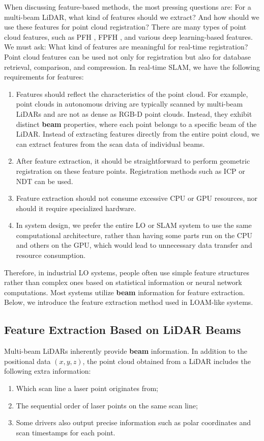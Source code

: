 When discussing feature-based methods, the most pressing questions are: For a multi-beam LiDAR, what kind of features should we extract? And how should we use these features for point cloud registration? There are many types of point cloud features, such as PFH \cite{Rusu2008}, FPFH \cite{Rusu2009a}, and various deep learning-based features. We must ask: What kind of features are meaningful for real-time registration? Point cloud features can be used not only for registration but also for database retrieval, comparison, and compression. In real-time SLAM, we have the following requirements for features:  
\begin{enumerate}  
	\item Features should reflect the characteristics of the point cloud. For example, point clouds in autonomous driving are typically scanned by multi-beam LiDARs and are not as dense as RGB-D point clouds. Instead, they exhibit distinct \textbf{beam} properties, where each point belongs to a specific beam of the LiDAR. Instead of extracting features directly from the entire point cloud, we can extract features from the scan data of individual beams.  
	\item After feature extraction, it should be straightforward to perform geometric registration on these feature points. Registration methods such as ICP or NDT can be used.  
	\item Feature extraction should not consume excessive CPU or GPU resources, nor should it require specialized hardware.  
	\item In system design, we prefer the entire LO or SLAM system to use the same computational architecture, rather than having some parts run on the CPU and others on the GPU, which would lead to unnecessary data transfer and resource consumption.  
\end{enumerate}  

Therefore, in industrial LO systems, people often use simple feature structures rather than complex ones based on statistical information or neural network computations. Most systems utilize \textbf{beam} information for feature extraction. Below, we introduce the feature extraction method used in LOAM-like systems.

\subsection{Feature Extraction Based on LiDAR Beams}  

Multi-beam LiDARs inherently provide \textbf{beam} information. In addition to the positional data $(x, y, z)$, the point cloud obtained from a LiDAR includes the following extra information:  
\begin{enumerate}  
	\item Which scan line a laser point originates from;  
	\item The sequential order of laser points on the same scan line;  
	\item Some drivers also output precise information such as polar coordinates and scan timestamps for each point.  
\end{enumerate}  

